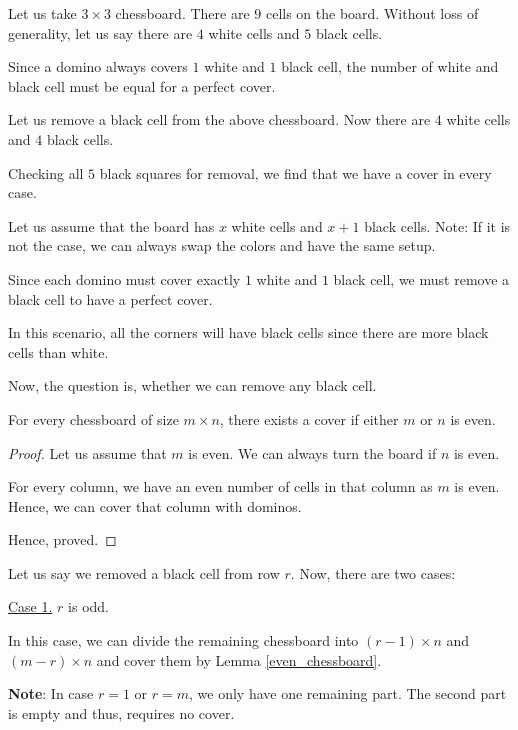 \begin{scratch}[b]
  Let us take $3 \times 3$ chessboard. There are $9$ cells on the board. Without loss of generality, let us say there are $4$ white cells and $5$ black cells.

  Since a domino always covers $1$ white and $1$ black cell, the number of white and black cell must be equal for a perfect cover.

  Let us remove a black cell from the above chessboard. Now there are $4$ white cells and $4$ black cells.

  Checking all $5$ black squares for removal, we find that we have a cover in every case.
\end{scratch}

\begin{solution}[b]
  Let us assume that the board has $x$ white cells and $x+1$ black cells.
	Note: If it is not the case, we can always swap the colors and have the same setup.

	Since each domino must cover exactly $1$ white and $1$ black cell, we must remove a black cell to have a perfect cover.

	In this scenario, all the corners will have black cells since there are more black cells than white.

	Now, the question is, whether we can remove any black cell. 

	\begin{lemma}\label{even_chessboard}
		For every chessboard of size $m \times n$, there exists a cover if either $m$ or $n$ is even.
	\end{lemma}

	\begin{proof}
		Let us assume that $m$ is even. We can always turn the board if $n$ is even.

		For every column, we have an even number of cells in that column as $m$ is even. Hence, we can cover that column with dominos.

		Hence, proved.
	\end{proof}


	Let us say we removed a black cell from row $r$. Now, there are two cases:
	\bigbreak

	\underline{Case 1.} $r$ is odd.

	In this case, we can divide the remaining chessboard into $(r-1) \times n$ and $(m-r) \times n$ and cover them by Lemma \ref{even_chessboard}.
	
	\textbf{Note}: In case $r = 1$ or $r = m$, we only have one remaining part. The second part is empty and thus, requires no cover.
	

\end{solution}
